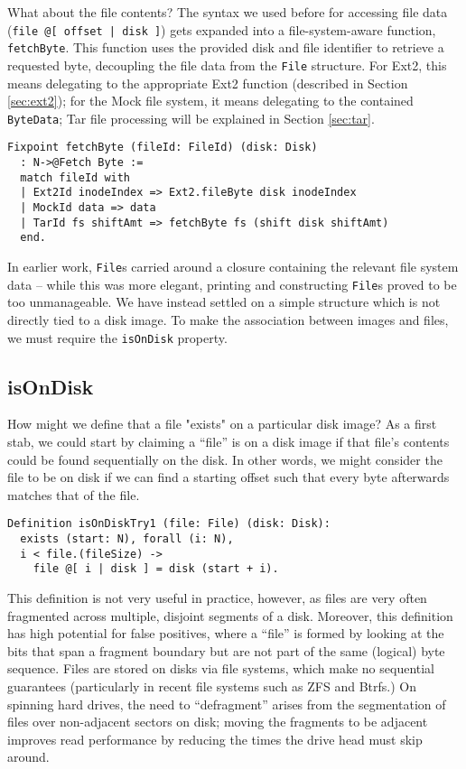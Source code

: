 \documentclass[nocopyrightspace]{sigplanconf}
\begin{document}
What about the file contents? The syntax we used before for accessing file
data ({\tt file @[ offset | disk ]}) gets expanded into a file-system-aware
function, {\tt fetchByte}. This function uses the provided disk and file
identifier to retrieve a requested byte, decoupling the file data from the
{\tt File} structure. For Ext2, this means delegating to the appropriate Ext2
function (described in Section \ref{sec:ext2}); for the Mock file system, it
means delegating to the contained {\tt ByteData}; Tar file processing will be
explained in Section \ref{sec:tar}.

\begin{lstlisting}
Fixpoint fetchByte (fileId: FileId) (disk: Disk)
  : N->@Fetch Byte := 
  match fileId with
  | Ext2Id inodeIndex => Ext2.fileByte disk inodeIndex
  | MockId data => data
  | TarId fs shiftAmt => fetchByte fs (shift disk shiftAmt)
  end.
\end{lstlisting}

In earlier work, {\tt File}s carried around a closure containing the relevant
file system data -- while this was more elegant, printing and constructing
{\tt File}s proved to be too unmanageable. We have instead settled on a simple
structure which is not directly tied to a disk image. To make the association
between images and files, we must require the {\tt isOnDisk} property.

\subsection{isOnDisk}

How might we define that a file "exists" on a particular disk image? As a
first stab, we could start by claiming a ``file'' is on a disk image if that
file's contents could be found sequentially on the disk. In other words, we
might consider the file to be on disk if we can find a starting offset such
that every byte afterwards matches that of the file.

\begin{lstlisting}
Definition isOnDiskTry1 (file: File) (disk: Disk):
  exists (start: N), forall (i: N),
  i < file.(fileSize) -> 
    file @[ i | disk ] = disk (start + i).
\end{lstlisting}

This definition is not very useful in practice, however, as files are very
often fragmented across multiple, disjoint segments of a disk. Moreover, this
definition has high potential for false positives, where a ``file'' is formed
by looking at the bits that span a fragment boundary but are not part of the
same (logical) byte sequence. Files are stored on disks via file systems,
which make no sequential guarantees (particularly in recent file systems such
as ZFS and Btrfs.) On spinning hard drives, the need to ``defragment'' arises
from the segmentation of files over non-adjacent sectors on disk; moving the
fragments to be adjacent improves read performance by reducing the times the
drive head must skip around.
\end{document}
